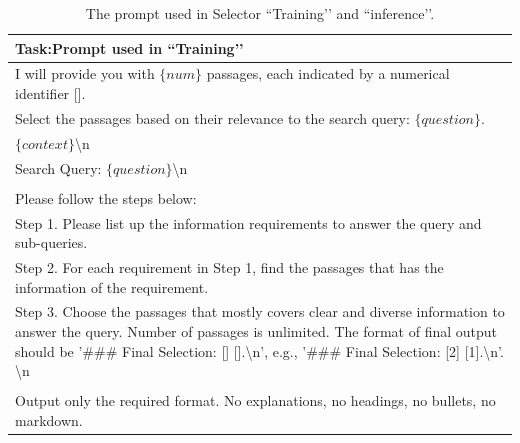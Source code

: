 \documentclass[11pt]{article}
\begin{document}
\begin{table}[h!t]
    \centering
    \begin{tabularx}{0.925\linewidth}{>{\raggedright\arraybackslash}X}
        \toprule
        \textbf{Task}:Prompt used in ``Training’’ \\
        \midrule
I will provide you with $\{num\}$ passages, each indicated by a numerical identifier []. \\
Select the passages based on their relevance to the search query: $\{question\}$.\\
$\{context\}$\textbackslash n\\
Search Query: $\{question\}$\textbackslash n\\ \\
Please follow the steps below:\\
Step 1. Please list up the information requirements to answer the query and sub-queries.\\
Step 2. For each requirement in Step 1, find the passages that has the information of the requirement.\\
Step 3. Choose the passages that mostly covers clear and diverse information to answer the query. Number of passages is unlimited. The format of final output should be '\#\#\# Final Selection: [] [].\textbackslash n', e.g., '\#\#\# Final Selection: [2] [1].\textbackslash n'. \textbackslash n\\ \\
Output only the required format. No explanations, no headings, no bullets, no markdown. \\ 
    \bottomrule
    \end{tabularx}
    \caption{The prompt used in Selector ``Training’’ and  ``inference’’.}
    \label{tab:prompt-infer}
\end{table}
\end{document}
